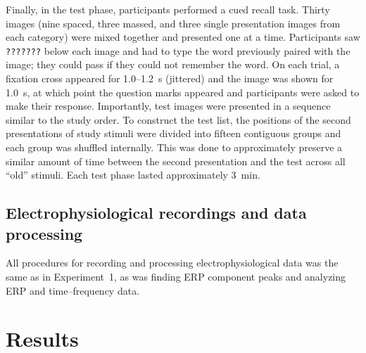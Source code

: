 
Finally, in the test phase, participants performed a cued recall task.  Thirty images (nine spaced, three massed, and three single presentation images from each category) were mixed together and presented one at a time.  Participants saw \texttt{???????} below each image and had to type the word previously paired with the image; they could pass if they could not remember the word.  On each trial, a fixation cross appeared for 1.0--1.2~s (jittered) and the image was shown for 1.0~s, at which point the question marks appeared and participants were asked to make their response.  Importantly, test images were presented in a sequence similar to the study order.  To construct the test list, the positions of the second presentations of study stimuli were divided into fifteen contiguous groups and each group was shuffled internally.  This was done to approximately preserve a similar amount of time between the second presentation and the test across all ``old'' stimuli.  Each test phase lasted approximately 3~min.



\subsection{Electrophysiological recordings and data processing}

All procedures for recording and processing electrophysiological data was the same as in Experiment~1, as was finding ERP component peaks and analyzing ERP and time--frequency data.

\section{Results}



